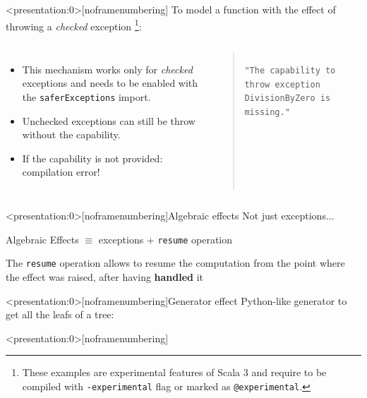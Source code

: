 \documentclass[aspectratio=1610,xcolor=dvipsnames]{beamer}
\begin{document}
%
\begin{frame}<presentation:0>[noframenumbering]
  \fontsize{8}{10}\selectfont
  To model a function with the effect of throwing a \textit{checked} exception
  \footnote{\tiny
    These examples are experimental features of Scala 3 and require to be compiled with \texttt{-experimental} flag or marked as \texttt{@experimental}.
  }:
  \begin{columns}
      
      \addtolength{\leftmargini}{\labelsep}
      \begin{itemize}
        \item This mechanism works only for \textit{checked} exceptions and needs to be enabled with the \texttt{saferExceptions} import.
        \item Unchecked exceptions can still be throw without the capability.
        \item If the capability is not provided: compilation error!
      \end{itemize}
    \begin{quote}
      \texttt{"The capability to throw exception DivisionByZero is missing."}
    \end{quote}
  \end{columns}
\end{frame}
%
\begin{frame}<presentation:0>[noframenumbering]{Algebraic effects}
  Not just exceptions...
  \begin{block}{}
    Algebraic Effects $\equiv$ exceptions + \texttt{resume} operation \cite{can-throw}
  \end{block}
  The \texttt{resume} operation allows to resume the computation from the point where the effect was raised, after having \textbf{handled} it
  
\end{frame}
%
\begin{frame}<presentation:0>[noframenumbering]{Generator effect \cite{scalar-gears}}
  Python-like generator to get all the leafs of a tree:
  
\end{frame}
%
\begin{frame}<presentation:0>[noframenumbering]
     
\end{frame}
%
\end{document}
